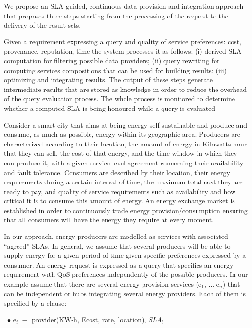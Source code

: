 We propose an SLA guided, continuous data provision and integration approach that proposes three steps  starting from the processing of the request  to the delivery of the result sets.

Given a requirement expressing a query and quality of service preferences: cost, provenance, reputation, time the system processes it  as follows: (i) derived SLA  computation for filtering possible data providers; (ii) query rewriting for computing services compositions that can be used for building results; (iii) optimizing and integrating results. The output of these steps generate intermediate results that are stored as knowledge in order to reduce the overhead of the query evaluation process. The whole process is monitored to determine whether a computed SLA is being honoured while a query is evaluated. 




Consider a smart city that aims at being energy self-sustainable and produce and consume, as much as possible, energy within its geographic area. 
Producers are characterized according to their location, the amount of energy in Kilowatts-hour that they can sell, the cost of that energy, and the time window in which they can produce it, with a given service level agreement concerning their availability and fault tolerance. 
Consumers are described by their location, their energy requirements during a certain interval of time, the maximum total cost they are ready to pay, and quality of service requirements such as availability and how critical it is to consume this amount of energy. 
An energy exchange market is established in order to continuously trade  energy provision/consumption ensuring that all consumers will have the energy they require at every moment.

In our approach, energy producers are modelled as services with associated ``agreed'' SLAs. 
In general, we assume that several producers will be able to supply energy for a given period of time given specific  preferences expressed by a consumer. 
An energy request is expressed as a query that specifies an energy requirement with QoS preferences independently of the possible producers. 
In our example assume that there are several energy provision services ({\sf e$_1$, ... e$_n$}) that can be independent or hubs integrating several energy providers. 
Each of them is specified by a clause:
\begin{trivlist}\sf\footnotesize
\item[~$\bullet$ ]   e$_i$ $\equiv$ provider(KW-h, Ecost, rate, location), \textit{SLA}$_i$
\end{trivlist}

